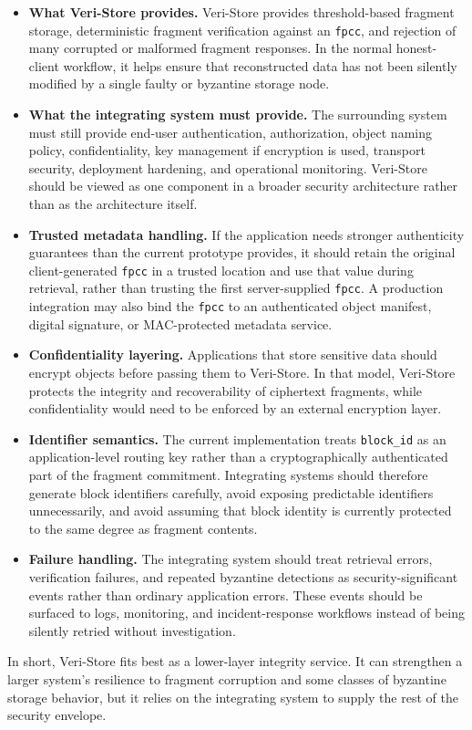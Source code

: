 \documentclass[../veristore_security_model.tex]{subfiles}
\begin{document}
\begin{itemize}
    \item \textbf{What Veri-Store provides.} Veri-Store provides threshold-based fragment storage, deterministic fragment verification against an \texttt{fpcc}, and rejection of many corrupted or malformed fragment responses. In the normal honest-client workflow, it helps ensure that reconstructed data has not been silently modified by a single faulty or byzantine storage node.

    \item \textbf{What the integrating system must provide.} The surrounding system must still provide end-user authentication, authorization, object naming policy, confidentiality, key management if encryption is used, transport security, deployment hardening, and operational monitoring. Veri-Store should be viewed as one component in a broader security architecture rather than as the architecture itself.

    \item \textbf{Trusted metadata handling.} If the application needs stronger authenticity guarantees than the current prototype provides, it should retain the original client-generated \texttt{fpcc} in a trusted location and use that value during retrieval, rather than trusting the first server-supplied \texttt{fpcc}. A production integration may also bind the \texttt{fpcc} to an authenticated object manifest, digital signature, or MAC-protected metadata service.

    \item \textbf{Confidentiality layering.} Applications that store sensitive data should encrypt objects before passing them to Veri-Store. In that model, Veri-Store protects the integrity and recoverability of ciphertext fragments, while confidentiality would need to be enforced by an external encryption layer.

    \item \textbf{Identifier semantics.} The current implementation treats \texttt{block\_id} as an application-level routing key rather than a cryptographically authenticated part of the fragment commitment. Integrating systems should therefore generate block identifiers carefully, avoid exposing predictable identifiers unnecessarily, and avoid assuming that block identity is currently protected to the same degree as fragment contents.

    \item \textbf{Failure handling.} The integrating system should treat retrieval errors, verification failures, and repeated byzantine detections as security-significant events rather than ordinary application errors. These events should be surfaced to logs, monitoring, and incident-response workflows instead of being silently retried without investigation.
\end{itemize}

In short, Veri-Store fits best as a lower-layer integrity service. It can strengthen a larger system's resilience to fragment corruption and some classes of byzantine storage behavior, but it relies on the integrating system to supply the rest of the security envelope.

\newpage
\end{document}
